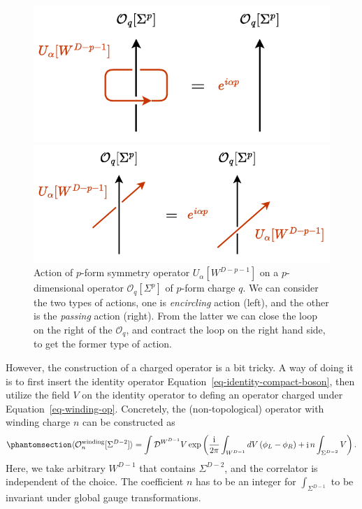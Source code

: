 \documentclass[
  letterpaper,
  DIV=11,
  numbers=noendperiod]{scrreport}
\DeclareMathOperator{\imunit}{i}
\newcommand{\stdim}{D}
\begin{document}
\begin{figure}[t]

\begin{minipage}{0.50\linewidth}
\includegraphics{figures/one-form_act.pdf}\end{minipage}%
%
\begin{minipage}{0.50\linewidth}
\includegraphics{figures/one_form_passing.pdf}\end{minipage}%

\caption{\label{fig-one-form}Action of \(p\)-form symmetry operator
\(U_\alpha[W^{D-p-1}]\) on a \(p\)-dimensional operator
\(\mathcal{O}_q[\Sigma^p]\) of \(p\)-form charge \(q\). We can consider
the two types of actions, one is \emph{encircling} action (left), and
the other is the \emph{passing} action (right). From the latter we can
close the loop on the right of the \(\mathcal{O}_q\), and contract the
loop on the right hand side, to get the former type of action.}

\end{figure}%

However, the construction of a charged operator is a bit tricky. A way
of doing it is to first insert the identity operator
Equation~\ref{eq-identity-compact-boson}, then utilize the field \(V\)
on the identity operator to defing an operator charged under
Equation~\ref{eq-winding-op}. Concretely, the (non-topological) operator
with winding charge \(n\) can be constructed as
\begin{equation}\phantomsection\label{eq-dual-op}{
\langle \mathcal{O}^\text{winding}_n[\Sigma^{D-2}] \rangle
= \int \mathcal{D}^{W^{\stdim-1}}V \exp\left(\frac{\imunit}{2\pi}\int_{W^{\stdim-1}} \mathop{dV}\left(\phi_L-\phi_R\right)+\imunit n \int_{\Sigma^{\stdim-2}}V\right).
}\end{equation} Here, we take arbitrary \(W^{\stdim-1}\) that contains
\(\Sigma^{\stdim-2}\), and the correlator is independent of the choice.
The coefficient \(n\) has to be an integer for \(\int_{\Sigma^{D-1}}\)
to be invariant under global gauge transformations.
\end{document}
